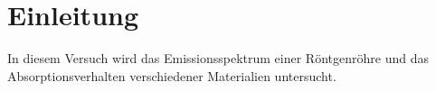 
\section{Einleitung}

In diesem Versuch wird das Emissionsspektrum einer Röntgenröhre und das
Absorptionsverhalten verschiedener Materialien untersucht.
